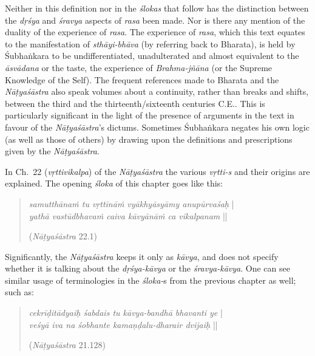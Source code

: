 Neither in this definition nor in the \textsl{ślokas} that follow has the distinction between the \textsl{dṛśya} and \textsl{śravya} aspects of \textsl{rasa} been made. Nor is there any mention of the duality of the experience of \textsl{rasa}. The experience of \textsl{rasa}, which this text equates to the manifestation of \textsl{sthāyi-bhāva} (by referring back to Bharata), is held by Śubhaṅkara to be undifferentiated, unadulterated and almost equivalent to the \textsl{āsvādana} or the taste, the experience of \textsl{Brahma-jñāna} (or the Supreme Knowledge of the Self). The frequent references made to Bharata and the \textsl{Nāṭyaśāstra} also speak volumes about a continuity, rather than breaks and shifts, between the third and the thirteenth/sixteenth centuries C.E.. This is particularly significant in the light of the presence of arguments in the text in favour of the \textsl{Nāṭyaśāstra}’s dictums. Sometimes Śubhaṅkara negates his own logic (as well as those of others) by drawing upon the definitions and prescriptions given by the \textsl{Nāṭyaśāstra}.       

In Ch.~22 (\textsl{vṛttivikalpa}) of the \textsl{Nāṭyaśāstra} the various \textsl{vṛtti-s} and their origins are explained. The opening \textsl{śloka} of this chapter goes like this:
\begin{quote}
\textsl{samutthānaṁ tu vṛttīnāṁ vyākhyāsyāmy anupūrvaśaḥ} |  \\
\textsl{yathā vastūdbhavaṁ caiva kāvyānāṁ ca vikalpanam} ||

\hfill(\textsl{Nāṭyaśāstra} 22.1)
\end{quote}

Significantly, the \textsl{Nāṭyaśāstra} keeps it only as \textsl{kāvya}, and does not specify whether it is talking about the \textsl{dṛśya-kāvya} or the \textsl{śravya-kāvya}. One can see similar usage of terminologies in the \textsl{śloka-}s from the previous chapter as well; such as:
\begin{quote}
\textsl{cekrīḍitādyaiḥ śabdais tu kāvya-bandhā bhavanti ye} |\\
\textsl{veśyā iva na śobhante kamaṇḍalu-dharair dvijaiḥ} ||

\hfill(\textsl{Nāṭyaśāstra} 21.128)
\end{quote}

